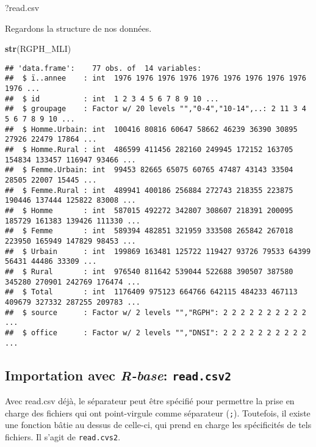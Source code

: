 \documentclass[]{book}
\newenvironment{Shaded}{\begin{snugshade}}{\end{snugshade}}
\newcommand{\KeywordTok}[1]{\textcolor[rgb]{0.13,0.29,0.53}{\textbf{#1}}}
\newcommand{\NormalTok}[1]{#1}
\begin{document}
\begin{Shaded}
\begin{Highlighting}[]
\NormalTok{?read.csv}
\end{Highlighting}
\end{Shaded}

Regardons la structure de nos données.

\begin{Shaded}
\begin{Highlighting}[]
\KeywordTok{str}\NormalTok{(RGPH_MLI)}
\end{Highlighting}
\end{Shaded}

\begin{verbatim}
## 'data.frame':    77 obs. of  14 variables:
##  $ ï..annee    : int  1976 1976 1976 1976 1976 1976 1976 1976 1976 1976 ...
##  $ id          : int  1 2 3 4 5 6 7 8 9 10 ...
##  $ groupage    : Factor w/ 20 levels "","0-4","10-14",..: 2 11 3 4 5 6 7 8 9 10 ...
##  $ Homme.Urbain: int  100416 80816 60647 58662 46239 36390 30895 27926 22479 17864 ...
##  $ Homme.Rural : int  486599 411456 282160 249945 172152 163705 154834 133457 116947 93466 ...
##  $ Femme.Urbain: int  99453 82665 65075 60765 47487 43143 33504 28505 22007 15445 ...
##  $ Femme.Rural : int  489941 400186 256884 272743 218355 223875 190446 137444 125822 83008 ...
##  $ Homme       : int  587015 492272 342807 308607 218391 200095 185729 161383 139426 111330 ...
##  $ Femme       : int  589394 482851 321959 333508 265842 267018 223950 165949 147829 98453 ...
##  $ Urbain      : int  199869 163481 125722 119427 93726 79533 64399 56431 44486 33309 ...
##  $ Rural       : int  976540 811642 539044 522688 390507 387580 345280 270901 242769 176474 ...
##  $ Total       : int  1176409 975123 664766 642115 484233 467113 409679 327332 287255 209783 ...
##  $ source      : Factor w/ 2 levels "","RGPH": 2 2 2 2 2 2 2 2 2 2 ...
##  $ office      : Factor w/ 2 levels "","DNSI": 2 2 2 2 2 2 2 2 2 2 ...
\end{verbatim}

\subsection{\texorpdfstring{Importation avec \emph{R-base}:
\texttt{read.csv2}}{Importation avec R-base: read.csv2}}\label{importation-avec-r-base-read.csv2}

Avec read.csv déjà, le séparateur peut être spécifié pour permettre la
prise en charge des fichiers qui ont point-virgule comme séparateur
(\texttt{;}). Toutefois, il existe une fonction bâtie au dessus de
celle-ci, qui prend en charge les spécificités de tels fichiers. Il
s'agit de \texttt{read.cvs2}.
\end{document}
